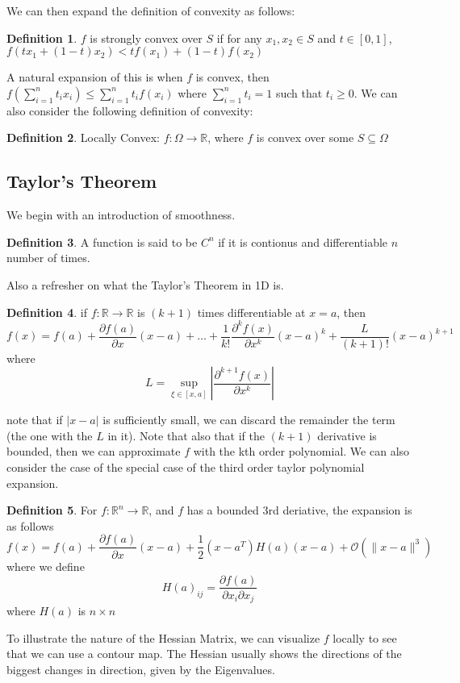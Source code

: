 \documentclass[11pt]{article}
\theoremstyle{definition}
\newtheorem{definition}{Definition}[section]
\newcommand{\R}{\mathbb{R}}
\begin{document}
We can then expand the definition of convexity as follows:
\begin{definition}
    $f$ is strongly convex over $S$ if for any $x_1, x_2 \in S$ and $t \in [0,1]$, $f(tx_1 + (1-t)x_2) < tf(x_1) + (1-t)f(x_2)$
\end{definition}
A natural expansion of this is when $f$ is convex, then $f \left( \sum_{i = 1}^{n} t_i x_i \right) \leq \sum_{i = 1}^{n} t_i f(x_i)$ where $\sum_{i = 1}^{n} t_i = 1$ such that $t_i \geq 0$. We can also consider the following definition of convexity:
\begin{definition}
  Locally Convex: $f: \Omega \to \R$, where $f$ is convex over some $S \subseteq \Omega$
\end{definition}
\subsection{Taylor's Theorem}
We begin with an introduction of smoothness.
\begin{definition}
  A function is said to be $C^n$ if it is contionus and differentiable $n$ number of times. 
\end{definition}
Also a refresher on what the Taylor's Theorem in 1D is. 
\begin{definition}
  if $f: \R \to \R$ is $(k+1)$ times differentiable at $x = a$, then 
  \[
  f(x) = f(a) + \frac{\partial f(a)}{\partial x}(x-a) + \dots + \frac{1}{k!} \frac{\partial^k f(x)}{\partial x^k}(x-a)^k + \frac{L}{(k+1)!}(x-a)^{k+1}
  \]
  where 
  \[
  L = \sup_{\xi \in [x,a]} \left| \frac{\partial^{k+1} f(x)}{\partial x^k} \right|
  \]
\end{definition}
note that if $|x-a|$ is sufficiently small, we can discard the remainder the term (the one with the $L$ in it). Note that also that if the $(k+1)$ derivative is bounded, then we can approximate $f$ with the kth order polynomial. We can also consider the case of the special case of the third order taylor polynomial expansion. 
\begin{definition}
  For $f: \R^n \to \R$, and $f$ has a bounded 3rd deriative, the expansion is as follows
  \[
  f(x) = f(a) + \frac{\partial f(a)}{\partial x} (x-a) + \frac{1}{2}(x-a^T) H(a)(x-a) + \mathcal{O}(\|x-a\|^3)
  \]
  where we define
  \[
  H(a)_{ij} = \frac{\partial f(a)}{\partial x_i \partial x_j}
  \]
  where $H(a)$ is $n \times n$
\end{definition}
To illustrate the nature of the Hessian Matrix, we can visualize $f$ locally to see that we can use a contour map. The Hessian usually shows the directions of the biggest changes in direction, given by the Eigenvalues. 
\end{document}
